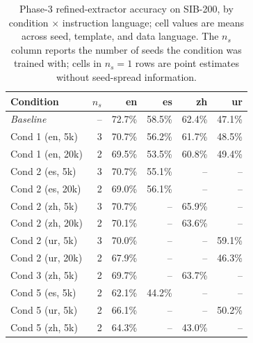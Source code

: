 \begin{table}[t]
  \centering
  \small
  \begin{tabular}{lrrrrr}
    \toprule
    Condition & $n_s$ & en & es & zh & ur \\
    \midrule
    \textit{Baseline} & -- & 72.7\% & 58.5\% & 62.4\% & 47.1\% \\
    Cond 1 (en, 5k) & 3 & 70.7\% & 56.2\% & 61.7\% & 48.5\% \\
    Cond 1 (en, 20k) & 2 & 69.5\% & 53.5\% & 60.8\% & 49.4\% \\
    Cond 2 (es, 5k) & 3 & 70.7\% & 55.1\% & -- & -- \\
    Cond 2 (es, 20k) & 2 & 69.0\% & 56.1\% & -- & -- \\
    Cond 2 (zh, 5k) & 3 & 70.7\% & -- & 65.9\% & -- \\
    Cond 2 (zh, 20k) & 2 & 70.1\% & -- & 63.6\% & -- \\
    Cond 2 (ur, 5k) & 3 & 70.0\% & -- & -- & 59.1\% \\
    Cond 2 (ur, 20k) & 2 & 67.9\% & -- & -- & 46.3\% \\
    Cond 3 (zh, 5k) & 2 & 69.7\% & -- & 63.7\% & -- \\
    Cond 5 (es, 5k) & 2 & 62.1\% & 44.2\% & -- & -- \\
    Cond 5 (ur, 5k) & 2 & 66.1\% & -- & -- & 50.2\% \\
    Cond 5 (zh, 5k) & 2 & 64.3\% & -- & 43.0\% & -- \\
    \bottomrule
  \end{tabular}
  \caption{Phase-3 refined-extractor accuracy on \textsc{SIB-200}, by condition $\times$ instruction language; cell values are means across seed, template, and data language. The $n_s$ column reports the number of seeds the condition was trained with; cells in $n_s\!=\!1$ rows are point estimates without seed-spread information.}
  \label{tab:t1-sib200}
\end{table}

